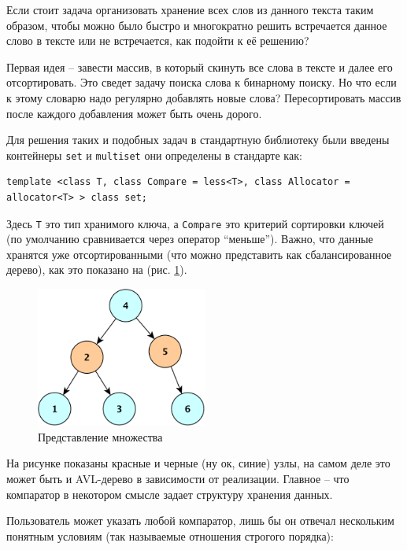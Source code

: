 \documentclass[a4paper,12pt,oneside]{article}
\begin{document}
Если стоит задача организовать хранение всех слов из данного текста таким образом, чтобы можно было быстро и многократно решить встречается данное слово в тексте или не встречается, как подойти к её решению?

Первая идея -- завести массив, в который скинуть все слова в тексте и далее его отсортировать. Это сведет задачу поиска слова к бинарному поиску. Но что если к этому словарю надо регулярно добавлять новые слова? Пересортировать массив после каждого добавления может быть очень дорого.

Для решения таких и подобных задач в стандартную библиотеку были введены контейнеры \lstinline!set! и \lstinline!multiset! они определены в стандарте как:

\begin{lstlisting}
template <class T, class Compare = less<T>, class Allocator = allocator<T> > class set;
\end{lstlisting}

Здесь \lstinline!T! это тип хранимого ключа, а \lstinline!Compare! это критерий сортировки ключей (по умолчанию сравнивается через оператор ``меньше''). Важно, что данные хранятся уже отсортированными (что можно представить как сбалансированное дерево), как это показано на (рис. \ref{fig:sets}).

\begin{figure}[ht]
\centering
\includegraphics[width=0.5\textwidth]{illustrations/sets-crop.pdf}
\caption{Представление множества}
\label{fig:sets}
\end{figure}

На рисунке показаны красные и черные (ну ок, синие) узлы, на самом деле это может быть и AVL-дерево в зависимости от реализации. Главное -- что компаратор в некотором смысле задает структуру хранения данных.

Пользователь может указать любой компаратор, лишь бы он отвечал нескольким понятным условиям (так называемые отношения строгого порядка):
\end{document}
